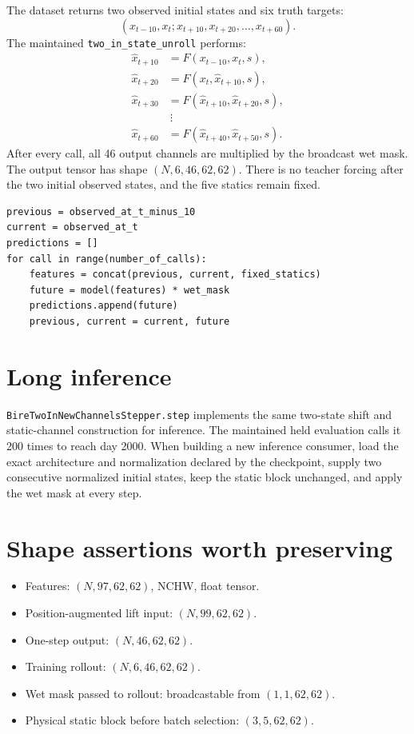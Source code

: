 \documentclass[11pt,oneside]{report}
\newcommand{\repo}[1]{\nolinkurl{#1}}
\begin{document}
The dataset returns two observed initial states and six truth targets:
\[
  \left(x_{t-10},x_t;
  x_{t+10},x_{t+20},\ldots,x_{t+60}\right).
\]
The maintained \repo{two_in_state_unroll} performs:
\begin{align*}
  \widehat{x}_{t+10} &= F(x_{t-10},x_t,s),\\
  \widehat{x}_{t+20} &= F(x_t,\widehat{x}_{t+10},s),\\
  \widehat{x}_{t+30} &= F(\widehat{x}_{t+10},
                              \widehat{x}_{t+20},s),\\
  &\ \vdots\\
  \widehat{x}_{t+60} &= F(\widehat{x}_{t+40},
                              \widehat{x}_{t+50},s).
\end{align*}
After every call, all 46 output channels are multiplied by the broadcast wet
mask. The output tensor has shape \((N,6,46,62,62)\). There is no teacher
forcing after the two initial observed states, and the five statics remain
fixed.

\begin{lstlisting}
previous = observed_at_t_minus_10
current = observed_at_t
predictions = []
for call in range(number_of_calls):
    features = concat(previous, current, fixed_statics)
    future = model(features) * wet_mask
    predictions.append(future)
    previous, current = current, future
\end{lstlisting}

\section{Long inference}

\repo{BireTwoInNewChannelsStepper.step} implements the same two-state shift and
static-channel construction for inference. The maintained held evaluation
calls it 200 times to reach day 2000. When building a new inference consumer,
load the exact architecture and normalization declared by the checkpoint,
supply two consecutive normalized initial states, keep the static block
unchanged, and apply the wet mask at every step.

\section{Shape assertions worth preserving}

\begin{itemize}
  \item Features: \((N,97,62,62)\), NCHW, float tensor.
  \item Position-augmented lift input: \((N,99,62,62)\).
  \item One-step output: \((N,46,62,62)\).
  \item Training rollout: \((N,6,46,62,62)\).
  \item Wet mask passed to rollout: broadcastable from \((1,1,62,62)\).
  \item Physical static block before batch selection: \((3,5,62,62)\).
\end{itemize}
\end{document}
